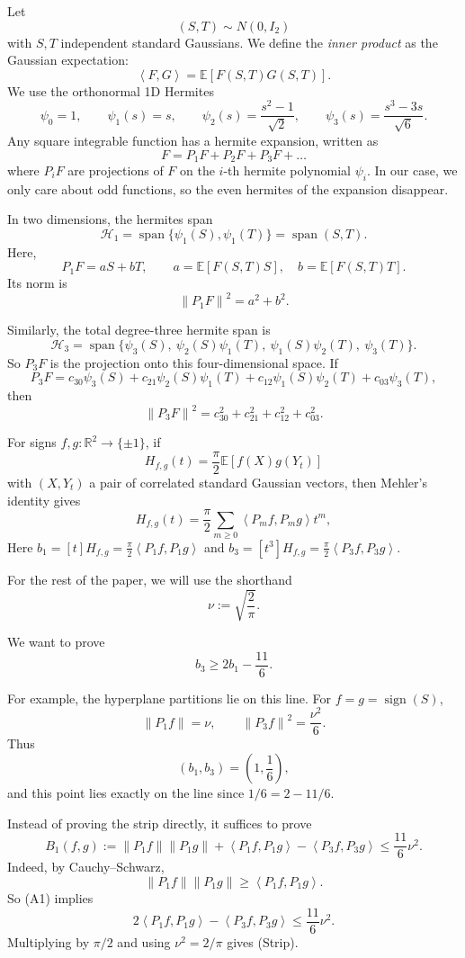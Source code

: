 \documentclass[11pt]{article}
\newcommand{\R}{\mathbb R}
\newcommand{\E}{\mathbb E}
\newcommand{\ip}[2]{\left\langle #1,#2\right\rangle}
\newcommand{\norm}[1]{\left\|#1\right\|}
\newcommand{\cH}{\mathcal H}
\newcommand{\sgn}{\operatorname{sign}}
\begin{document}
Let
\[
        (S,T)\sim N(0,I_2)
\]
with $S,T$ independent standard Gaussians. We define the \textit{inner product} as the Gaussian expectation:
\[
        \ip{F}{G}=\E[F(S,T)G(S,T)].
\]
We use the orthonormal 1D Hermites
\[
        \psi_0=1,\qquad
        \psi_1(s)=s,\qquad
        \psi_2(s)=\frac{s^2-1}{\sqrt2},\qquad
        \psi_3(s)=\frac{s^3-3s}{\sqrt6}.
\]
Any square integrable function has a hermite expansion, written as 
\[F = P_1  F + P_2 F + P_3 F + \ldots \]
where $P_i F$ are projections of $F$ on the $i$-th hermite polynomial $\psi_i$. In our case, we only care about odd functions, so the even hermites of the expansion disappear. 

In two dimensions, the hermites span
\[
        \cH_1=\operatorname{span}\{\psi_1(S),\psi_1(T)\} = \operatorname{span}(S, T).
\]
Here, 
\[
        P_1F=aS+bT,
        \qquad
        a=\E[F(S,T)S],\quad b=\E[F(S,T)T].
\]
Its norm is
\[
        \norm{P_1F}^2=a^2+b^2.
\]

Similarly, the total degree-three hermite span is
\[
        \cH_3=\operatorname{span}\{\psi_3(S),\ \psi_2(S)\psi_1(T),\ \psi_1(S)\psi_2(T),\ \psi_3(T)\}.
\]
So $P_3F$ is the projection onto this four-dimensional space.  If
\[
        P_3F
        =c_{30}\psi_3(S)
         +c_{21}\psi_2(S)\psi_1(T)
         +c_{12}\psi_1(S)\psi_2(T)
         +c_{03}\psi_3(T),
\]
then
\[
        \norm{P_3F}^2=c_{30}^2+c_{21}^2+c_{12}^2+c_{03}^2.
\]


For signs $f,g:\R^2\to\{\pm1\}$, if
\[
        H_{f,g}(t)=\frac\pi2\E[f(X)g(Y_t)]
\]
with $(X,Y_t)$ a pair of correlated standard Gaussian vectors, then Mehler's identity gives
\[
        H_{f,g}(t)=\frac\pi2\sum_{m\ge0}\ip{P_mf}{P_mg}t^m,
\]
Here $b_1=[t]H_{f,g} = \frac\pi2\ip{P_1f}{P_1g}$ and $b_3=[t^3]H_{f,g} = \frac\pi2\ip{P_3f}{P_3g}$.

For the rest of the paper, we will use the shorthand
\[
\nu := \sqrt{\frac{2}{\pi}}.
\]

We want to prove 
\begin{equation}
        b_3 \ge 2b_1 -\frac{11}{6}.
        \tag{Strip}
\end{equation}

For example, the hyperplane partitions lie on this line.  For $f=g=\sgn(S)$,
\[
        \norm{P_1f}=\nu,
        \qquad
        \norm{P_3f}^2=\frac{\nu^2}{6}.
\]
Thus
\[
        (b_1,b_3)=\left(1,\frac16\right),
\]
and this point lies exactly on the line since $1/6=2-11/6$.

Instead of proving the strip directly, it suffices to prove
\begin{equation}
        B_1(f,g)
        :=\norm{P_1f}\norm{P_1g}
          +\ip{P_1f}{P_1g}
          -\ip{P_3f}{P_3g}
        \le \frac{11}{6}\nu^2.
        \tag{A1}
\end{equation}
Indeed, by Cauchy--Schwarz,
\[
        \norm{P_1f}\norm{P_1g}\ge \ip{P_1f}{P_1g}.
\]
So (A1) implies
\[
        2\ip{P_1f}{P_1g}-\ip{P_3f}{P_3g}\le \frac{11}{6}\nu^2.
\]
Multiplying by $\pi/2$ and using $\nu^2=2/\pi$ gives (Strip).
\end{document}
